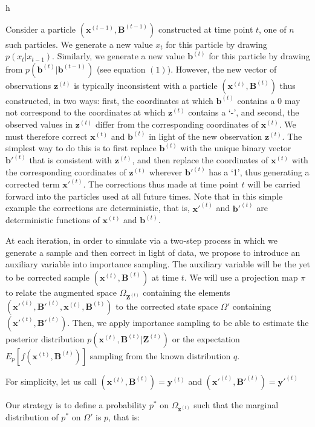 h\documentclass[11pt,a4paper]{article}
\renewcommand{\vec}[1]{\mathbf{#1}}
\begin{document}
Consider a particle $(\vec{x}^{(t-1)},\vec{B}^{(t-1)})$ constructed at time point $t$, one of $n$ such particles. We generate a new value $x_t$ for this particle by drawing $p(x_t | x_{t-1})$. Similarly, we generate a new value $\vec{b}^{(t)}$ for this particle by drawing from $p(\vec{b}^{(t)} | \vec{b}^{(t-1)})$ (see equation $(1)$). However, the new vector of observations $\vec{z}^{(t)}$ is typically inconsistent with a particle $(\vec{x}^{(t)}, \vec{B}^{(t)})$ thus constructed, in two ways: first, the coordinates at which $\vec{b}^{(t)}$ contains a 0 may not correspond to the coordinates at which $\vec{z}^{(t)}$ contains a `-', and second, the observed values in $\vec{z}^{(t)}$ differ from the corresponding coordinates of $\vec{x}^{(t)}$. We must therefore correct $\vec{x}^{(t)}$ and $\vec{b}^{(t)}$ in light of the new observation $\vec{z}^{(t)}$. The simplest way to do this is to first replace $\vec{b}^{(t)}$ with the unique binary vector $\vec{b'}^{(t)}$ that is consistent with $\vec{z}^{(t)}$, and then replace the coordinates of $\vec{x}^{(t)}$ with the corresponding coordinates of $\vec{z}^{(t)}$ wherever $\vec{b'}^{(t)}$ has a `1', thus generating a corrected term $\vec{x'}^{(t)}$. The corrections thus made at time point $t$ will be carried forward into the particles used at all future times. Note that in this simple example the corrections are deterministic, that is, $\vec{x'}^{(t)}$ and $\vec{b'}^{(t)}$ are deterministic functions of $\vec{x}^{(t)}$ and $\vec{b}^{(t)}$. 

At each iteration, in order to simulate via a two-step process in which we generate a sample and then correct in light of data, we propose to introduce an auxiliary variable into importance sampling. The auxiliary variable will be the yet to be corrected sample $(\vec{x}^{(t)}, \vec{B}^{(t)})$ at time $t$. We will use a projection map $\pi$ to relate the augmented space $\Omega_{\vec{Z}^{(t)}}$ containing the elements $(\vec{x'}^{(t)}, \vec{B'}^{(t)}, \vec{x}^{(t)}, \vec{B}^{(t)})$ to the corrected state space $\Omega'$ containing $(\vec{x'}^{(t)}, \vec{B'}^{(t)})$. Then, we apply importance sampling to be able to estimate the posterior distribution $p(\vec{x}^{(t)}, \vec{B}^{(t)} | \vec{Z}^{(t)})$ or the expectation $E_{p}[f(\vec{x}^{(t)},\vec{B}^{(t)})]$  sampling from the known distribution $q$.

For simplicity, let us call $(\vec{x}^{(t)}, \vec{B}^{(t)}) = \vec{y}^{(t)}$ and $(\vec{x'}^{(t)}, \vec{B'}^{(t)}) = \vec{y'}^{(t)}$

Our strategy is to define a probability $p^*$ on $\Omega_{\vec{z}^{(t)}}$ such that the marginal distribution of $p^*$ on $\Omega'$ is $p$, that is:
\end{document}
